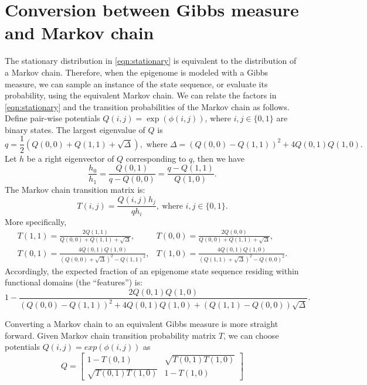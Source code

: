 \documentclass[11pt]{article}
\begin{document}
\clearpage




\clearpage

\appendix
\section{Conversion between Gibbs measure  and Markov chain}

The stationary distribution in \eqref{eqn:stationary} is equivalent to
the distribution of a Markov chain. Therefore, when the epigenome is
modeled with a Gibbs measure, we can sample an instance of the state
sequence, or evaluate its probability, using the equivalent Markov
chain. We can relate the factors in \eqref{eqn:stationary} and the
transition probabilities of the Markov chain as follows. Define
pair-wise potentials $Q(i,j)=\exp(\phi(i, j))$, where $i, j\in\{0,1\}$
are binary states. The largest eigenvalue of $Q$ is
\[
q=\textstyle\frac{1}{2}\left(Q(0,0)+Q(1,1) +\sqrt{\Delta}\right), \text{ where }
\Delta=(Q(0,0) - Q(1,1))^2 + 4Q(0,1)Q(1,0).
\]
Let $h$ be a right eigenvector of $Q$ corresponding to $q$, then we have
\[
\frac{h_0}{h_1} = \frac{Q(0,1)}{q-Q(0,0)} = \frac{q-Q(1,1)}{Q(1,0)}.
\]
The Markov chain transition matrix is:
\[
T(i,j) = \frac{Q(i,j)h_j}{qh_{i}},~\text{where } i,j \in\{0,1\}.
\]
More specifically,
\begin{equation} \label{eqn:gibbs2markov}
  \begin{array}{ll}
    T(1,1) = \displaystyle\frac{2Q(1,1)}{Q(0,0)+Q(1,1)+\sqrt{\Delta}}, &
    T(0,0) = \displaystyle\frac{2Q(0,0)}{Q(0,0)+Q(1,1)+\sqrt{\Delta}}, \\[2em]
    T(0,1) = \displaystyle\frac{4Q(0,1)Q(1,0)}{(Q(0,0)+\sqrt{\Delta})^2 -Q(1,1)^2}, &
    T(1,0) = \displaystyle\frac{4Q(0,1)Q(1,0)}{(Q(1,1)+\sqrt{\Delta})^2 -Q(0,0)^2}.
  \end{array}
\end{equation}
Accordingly, the expected fraction of an epigenome state sequence
residing within functional domains (the ``features'') is:
\[
1- \frac{2Q(0,1)Q(1,0)}{(Q(0,0)-Q(1,1))^2 + 4Q(0,1)Q(1,0) +
  (Q(1,1)-Q(0,0))\sqrt{\Delta}}.
\]


Converting a Markov chain to an equivalent Gibbs measure is more
straight forward. Given Markov chain transition probability matrix
$T$, we can choose potentials $Q(i,j) = exp(\phi(i,j))$ as 
\[
Q =
 \begin{bmatrix}
   1 - T(0,1) & \sqrt{T(0,1)T(1,0)} \\
    \sqrt{T(0,1)T(1,0)} & 1-T(1,0)
 \end{bmatrix}
\]
\end{document}
